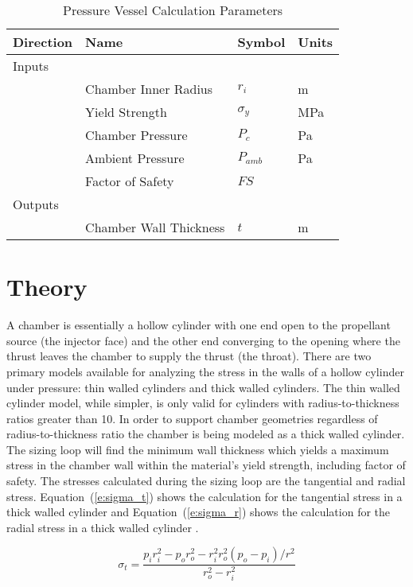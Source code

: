 \documentclass{article}
\begin{document}
\begin{table}[ht!]%
  \caption{Pressure Vessel Calculation Parameters}
  \centering
  \begin{tabular}{llll}
   Direction & Name & Symbol & Units \\
	\hline\hline
     Inputs & & &\\
     	        & Chamber Inner Radius & $r_i$ & m \\
                & Yield Strength & $\sigma_y$ & MPa \\
                & Chamber Pressure & $P_c$ & Pa \\
                & Ambient Pressure & $P_{amb}$ & Pa \\
                & Factor of Safety & $FS$ & \\
      Outputs & & & \\
                & Chamber Wall Thickness & $t$ & m \\
	\hline
  \end{tabular}
 \label{t:parameters}
\end{table}


\section{Theory}
A chamber is essentially a hollow cylinder with one end open to the propellant source (the injector face) and the other end converging to the opening where the thrust leaves the chamber to supply the thrust (the throat).  There are two primary models available for analyzing the stress in the walls of a hollow cylinder under pressure:  thin walled cylinders and thick walled cylinders.  The thin walled cylinder model, while simpler, is only valid for cylinders with radius-to-thickness ratios greater than 10.  In order to support chamber geometries regardless of radius-to-thickness ratio the chamber is being modeled as a thick walled cylinder.  The sizing loop will find the minimum wall thickness which yields a maximum stress in the chamber wall within the material's yield strength, including factor of safety.  The stresses calculated during the sizing loop are the tangential and radial stress.  Equation~(\ref{e:sigma_t}) shows the calculation for the tangential stress in a thick walled cylinder and Equation~(\ref{e:sigma_r}) shows the calculation for the radial stress in a thick walled cylinder \cite{Shigley1989}. 

\begin{equation}
 \label{e:sigma_t}
  \sigma_t = \frac{p_i r_i^2 - p_o r_o^2 - r_i^2 r_o^2 (p_o - p_i)/r^2}{r_o^2 - r_i^2}
\end{equation}
\end{document}
